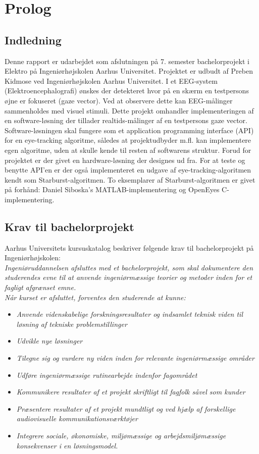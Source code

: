 \documentclass[rapport.tex]{subfiles}
\begin{document}
\section{Prolog}
	\subsection{Indledning}
	Denne rapport er udarbejdet som afslutningen på 7. semester bachelorprojekt i Elektro på Ingeniørhøjskolen Aarhus Universitet. Projektet er udbudt af Preben Kidmose ved Ingeniørhøjskolen Aarhus Universitet. I et EEG-system (Elektroencephalografi) ønskes der detekteret hvor på en skærm en testpersons øjne er fokuseret (gaze vector). Ved at observere dette kan EEG-målinger sammenholdes med visuel stimuli. Dette projekt omhandler implementeringen af en software-løsning der tillader realtids-målinger af en testpersons gaze vector. Software-løsningen skal fungere som et application programming interface (API) for en eye-tracking algoritme, således at projektudbyder m.fl. kan implementere egen algoritme, uden at skulle kende til resten af softwarens struktur.  Forud for projektet er der givet en hardware-løsning der designes ud fra. For at teste og benytte API'en er der også implementeret en udgave af eye-tracking-algoritmen kendt som Starburst-algoritmen. To eksemplarer af Starburst-algoritmen er givet på forhånd: Daniel Siboska's MATLAB-implementering og OpenEyes C-implementering. 
	
	\subsection{Krav til bachelorprojekt}
	Aarhus Universitets kursuskatalog beskriver følgende krav til bachelorprojekt på Ingeniørhøjskolen:\\
	
	
\textit{	Ingeniøruddannelsen afsluttes med et bachelorprojekt, som skal dokumentere den studerendes evne til at anvende ingeniørmæssige teorier og metoder inden for et fagligt afgrænset emne. }\\

	
\textit{	Når kurset er afsluttet, forventes den studerende at kunne: 
}	
	\begin{itemize}
		\item\textit{ Anvende videnskabelige forskningsresultater og indsamlet teknisk viden til løsning af tekniske problemstillinger}
		\item \textit{Udvikle nye løsninger}
		\item \textit{Tilegne sig og vurdere ny viden inden for relevante ingeniørmæssige områder}
		\item \textit{Udføre ingeniørmæssige rutinearbejde indenfor fagområdet}
		\item \textit{Kommunikere resultater af et projekt skriftligt til fagfolk såvel som kunder}
		\item \textit{Præsentere resultater af et projekt mundtligt og ved hjælp af forskellige audiovisuelle kommunikationsværktøjer}
		\item \textit{Integrere sociale, økonomiske, miljømæssige og arbejdsmiljømæssige konsekvenser i en løsningsmodel.}
	\end{itemize}
	
\end{document}
